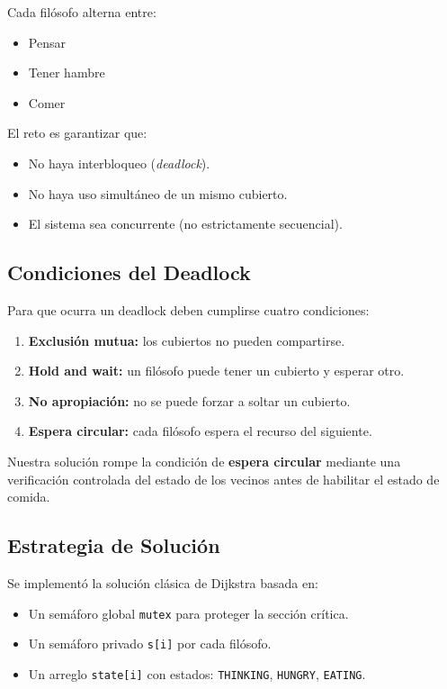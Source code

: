\documentclass[12pt]{article}
\begin{document}
Cada filósofo alterna entre:

\begin{itemize}
  \item Pensar
  \item Tener hambre
  \item Comer
\end{itemize}

El reto es garantizar que:

\begin{itemize}
  \item No haya interbloqueo (\textit{deadlock}).
  \item No haya uso simultáneo de un mismo cubierto.
  \item El sistema sea concurrente (no estrictamente secuencial).
\end{itemize}

\subsection{Condiciones del Deadlock}
\label{subsec:condiciones-deadlock}

Para que ocurra un deadlock deben cumplirse cuatro condiciones:

\begin{enumerate}
  \item \textbf{Exclusión mutua:} los cubiertos no pueden compartirse.
  \item \textbf{Hold and wait:} un filósofo puede tener un cubierto y esperar otro.
  \item \textbf{No apropiación:} no se puede forzar a soltar un cubierto.
  \item \textbf{Espera circular:} cada filósofo espera el recurso del siguiente.
\end{enumerate}

Nuestra solución rompe la condición de \textbf{espera circular} mediante una verificación controlada del estado de los vecinos antes de habilitar el estado de comida.

\subsection{Estrategia de Solución}
\label{subsec:estrategia}

Se implementó la solución clásica de Dijkstra basada en:

\begin{itemize}
  \item Un semáforo global \texttt{mutex} para proteger la sección crítica.
  \item Un semáforo privado \texttt{s[i]} por cada filósofo.
  \item Un arreglo \texttt{state[i]} con estados: \texttt{THINKING}, \texttt{HUNGRY}, \texttt{EATING}.
\end{itemize}
\end{document}
